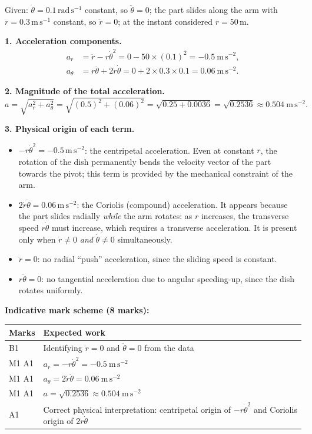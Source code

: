 \documentclass[11pt]{article}
\newcommand{\cle}[1]{{\popxbold\color{popdark}#1}}
\begin{document}
\begin{corrige}
Given: $\dot{\theta} = 0.1\,\mathrm{rad\,s^{-1}}$ constant, so $\ddot{\theta} = 0$; the part slides along the arm with $\dot{r} = 0.3\,\mathrm{m\,s^{-1}}$ constant, so $\ddot{r} = 0$; at the instant considered $r = 50\,\mathrm{m}$.

\textbf{1. Acceleration components.}
\begin{align*}
a_r &= \ddot{r} - r\dot{\theta}^2 = 0 - 50 \times (0.1)^2 = -0.5\ \mathrm{m\,s^{-2}},\\[2pt]
a_\theta &= r\ddot{\theta} + 2\dot{r}\dot{\theta} = 0 + 2 \times 0.3 \times 0.1 = 0.06\ \mathrm{m\,s^{-2}}.
\end{align*}

\textbf{2. Magnitude of the total acceleration.}
\[ a = \sqrt{a_r^2 + a_\theta^2} = \sqrt{(0.5)^2 + (0.06)^2} = \sqrt{0.25 + 0.0036} = \sqrt{0.2536} \approx 0.504\ \mathrm{m\,s^{-2}}. \]

\textbf{3. Physical origin of each term.}
\begin{itemize}
\item $-r\dot{\theta}^2 = -0.5\,\mathrm{m\,s^{-2}}$: the \cle{centripetal acceleration}. Even at constant $r$, the rotation of the dish permanently bends the velocity vector of the part towards the pivot; this term is provided by the mechanical constraint of the arm.
\item $2\dot{r}\dot{\theta} = 0.06\,\mathrm{m\,s^{-2}}$: the \cle{Coriolis (compound) acceleration}. It appears because the part slides radially \emph{while} the arm rotates: as $r$ increases, the transverse speed $r\dot\theta$ must increase, which requires a transverse acceleration. It is present only when $\dot r \neq 0$ \emph{and} $\dot\theta \neq 0$ simultaneously.
\item $\ddot{r} = 0$: no radial ``push'' acceleration, since the sliding speed is constant.
\item $r\ddot{\theta} = 0$: no tangential acceleration due to angular speeding-up, since the dish rotates uniformly.
\end{itemize}

\textbf{Indicative mark scheme (8 marks):}
\begin{center}
\begin{tabularx}{\linewidth}{|l|X|}
\hline
\rowcolor{popblueL} \textbf{Marks} & \textbf{Expected work} \\
\hline
B1 & Identifying $\ddot r = 0$ and $\ddot\theta = 0$ from the data \\
\hline
M1 A1 & $a_r = -r\dot\theta^2 = -0.5\ \mathrm{m\,s^{-2}}$ \\
\hline
M1 A1 & $a_\theta = 2\dot r\dot\theta = 0.06\ \mathrm{m\,s^{-2}}$ \\
\hline
M1 A1 & $a = \sqrt{0.2536} \approx 0.504\ \mathrm{m\,s^{-2}}$ \\
\hline
A1 & Correct physical interpretation: centripetal origin of $-r\dot\theta^2$ and Coriolis origin of $2\dot r\dot\theta$ \\
\hline
\end{tabularx}
\end{center}


\end{corrige}
\end{document}

